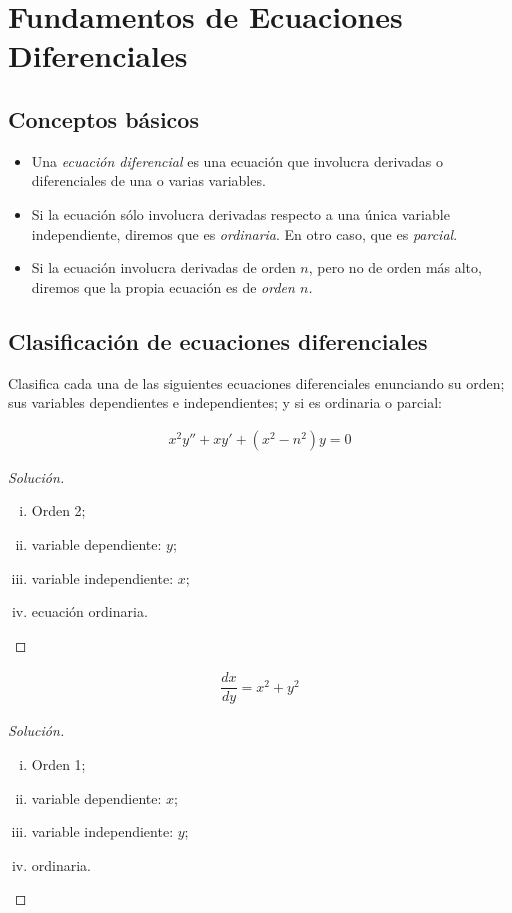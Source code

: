 \section{Fundamentos de Ecuaciones Diferenciales}

\subsection{Conceptos básicos}

\begin{itemize}
	\item 	Una \emph{ecuación diferencial} es una ecuación que involucra derivadas o diferenciales de una o varias variables.
	\item Si la ecuación sólo involucra derivadas respecto a una única variable independiente, diremos que es \emph{ordinaria}.  En otro caso, que es \emph{parcial}.
	\item Si la ecuación involucra derivadas de orden $n$, pero no de orden más alto, diremos que la propia ecuación es de \emph{orden $n$.}
\end{itemize}

\subsection{Clasificación de ecuaciones diferenciales}

\begin{resuelto}
	Clasifica cada una de las siguientes ecuaciones diferenciales enunciando su orden; sus variables dependientes e independientes; y si es ordinaria o parcial:
\end{resuelto}


\begin{align*}
	x^2y''+xy'+\left(x^2-n^2\right)y = 0
\end{align*}

\begin{proof}[Solución]
	\begin{enumerate}[(i)]
		\item Orden 2;
		\item variable dependiente: $ y $;
		\item variable independiente: $ x $;
		\item ecuación ordinaria.
	\end{enumerate}
\end{proof}


\begin{align*}
	\dfrac{dx}{dy}= x^{2}+y^{2}
\end{align*}
\begin{proof}[Solución]
	\begin{enumerate}[(i)]
		\item Orden 1;
		\item variable dependiente: $ x $;
		\item variable independiente: $ y $;
		\item ordinaria.
	\end{enumerate}
\end{proof}

